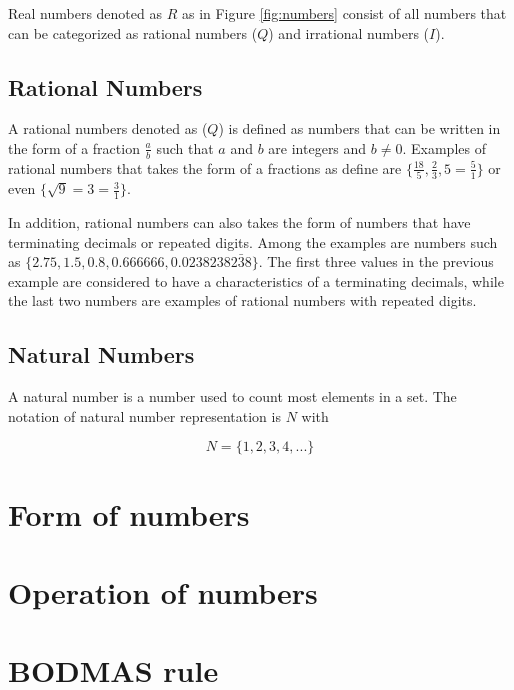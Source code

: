 \documentclass[
]{book}
\begin{document}
Real numbers denoted as \(R\) as in Figure \ref{fig:numbers} consist of all numbers that can be categorized as rational numbers (\(Q\)) and irrational numbers (\(I\)).

\hypertarget{rational-numbers}{%
\subsection{Rational Numbers}\label{rational-numbers}}

A rational numbers denoted as (\(Q\)) is defined as numbers that can be written in the form of a fraction \(\frac{a}{b}\) such that \(a\) and \(b\) are integers and \(b \ne 0\). Examples of rational numbers that takes the form of a fractions as define are \(\{ \frac{18}{5}, \frac{2}{3}, 5=\frac{5}{1} \}\) or even \(\{ \sqrt{9}=3=\frac{3}{1} \}\).

In addition, rational numbers can also takes the form of numbers that have terminating decimals or repeated digits. Among the examples are numbers such as \(\{ 2.75, 1.5, 0.8, 0.666666, 0.0238238\bar{238} \}\). The first three values in the previous example are considered to have a characteristics of a terminating decimals, while the last two numbers are examples of rational numbers with repeated digits.

\hypertarget{natural-numbers}{%
\subsection{Natural Numbers}\label{natural-numbers}}

A natural number is a number used to count most elements in a set. The notation of natural number representation is \(N\) with

\[N = \{ 1, 2, 3, 4, ... \}\]

\hypertarget{form-of-numbers}{%
\section{Form of numbers}\label{form-of-numbers}}

\hypertarget{operation-of-numbers}{%
\section{Operation of numbers}\label{operation-of-numbers}}

\hypertarget{bodmas-rule}{%
\section{BODMAS rule}\label{bodmas-rule}}
\end{document}
